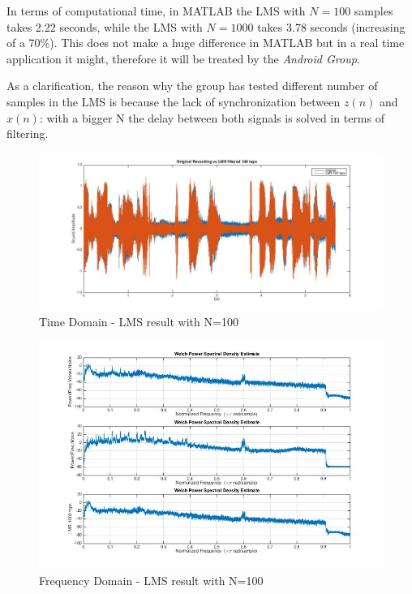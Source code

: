 \documentclass[11pt,a4paper,english]{book}  %
\theoremstyle{definition}  %
\theoremstyle{plain}  %
\theoremstyle{remark}  %
\begin{document}
	In terms of computational time, in MATLAB the LMS with $N=100$ samples takes 2.22 seconds, while the LMS with $N=1000$ takes 3.78 seconds (increasing of a 70\%). This does not make a huge difference in MATLAB but in a real time application it might, therefore it will be treated by the \textit{Android Group}.
	

	As a clarification, the reason why the group has tested different number of samples in the LMS is because the lack of synchronization between $z(n)$ and $x(n)$: with a bigger N the delay between both signals is solved in terms of filtering.
	
		\begin{figure}[h]
		\centering
		\includegraphics[width=15cm]{images/theory/lms100tapstime.jpg}
		\caption{Time Domain - LMS result with N=100}
		\label{fig:lmstime100}
		\end{figure}
		
		
		\begin{figure}[h]
		\centering
		\includegraphics[width=15cm]{images/theory/lms100tapsfreq.jpg}
		\caption{Frequency Domain - LMS result with N=100}
		\label{fig:lmsfreq100}
		\end{figure}
		
\end{document}
